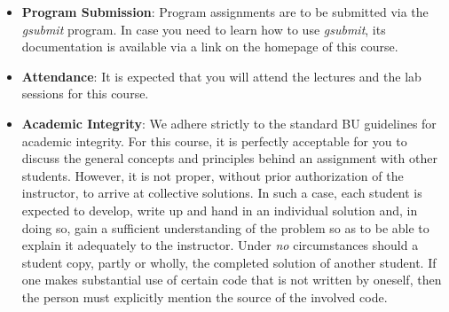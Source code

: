\documentclass[11pt]{article}
\begin{document}
\begin{itemize}
\item
{\bf Program Submission}: Program assignments are to be submitted via the
{\em gsubmit} program. In case you need to learn how to use {\em gsubmit},
its documentation is available via a link on the homepage of this course.

\item
{\bf Attendance}:
It is expected that you will attend the lectures and the lab sessions
for this course.

\item
{\bf Academic Integrity}:
We adhere strictly to the standard BU guidelines for academic
integrity. For this course, it is perfectly acceptable for you to discuss
the general concepts and principles behind an assignment with other
students. However, it is not proper, without prior authorization of the
instructor, to arrive at collective solutions. In such a case, each student
is expected to develop, write up and hand in an individual solution and, in
doing so, gain a sufficient understanding of the problem so as to be able
to explain it adequately to the instructor.  Under {\em no} circumstances
should a student copy, partly or wholly, the completed solution of another
student. If one makes substantial use of certain code that is not written by
oneself, then the person must explicitly mention the source of the involved
code.

\end{itemize}
\end{document}
